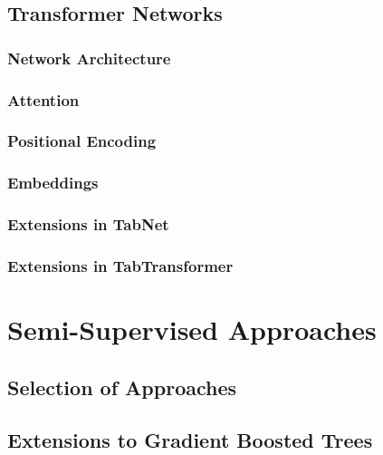 \subsection{Transformer Networks}\label{transformer-networks}

\subsubsection{Network Architecture}\label{network-architecture}

\subsubsection{Attention}\label{attention}

\subsubsection{Positional Encoding}\label{positional-encoding}

\subsubsection{Embeddings}\label{embeddings}

\subsubsection{Extensions in TabNet}\label{extensions-in-tabnet}

\subsubsection{Extensions in
TabTransformer}\label{extensions-in-tabtransformer}

\newpage
\section{Semi-Supervised Approaches}\label{semi-supervised-approaches}

\subsection{Selection of Approaches}\label{selection-of-approaches-1}

\subsection{Extensions to Gradient Boosted
Trees}\label{extensions-to-gradient-boosted-trees}

